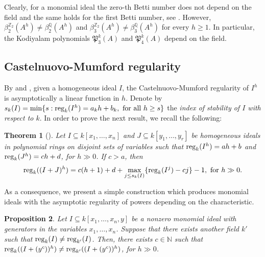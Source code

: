 \documentclass[11pt,oneside]{amsart}
\theoremstyle{plain}
\newtheorem{theorem}{Theorem}[section]
\newtheorem{proposition}[theorem]{Proposition}
\theoremstyle{definition}
\newcommand{\reg}{{\rm reg}}
\newcommand{\Q}{\mathbb{Q}}
\newcommand{\Z}{\mathbb{Z}}
\begin{document}
Clearly, for a monomial ideal the zero-th Betti number does not depend on the field and the same holds for the first Betti number, see \cite[Corollary 5.3]{BH95}. However, $\beta_2^{\Z_2}(A^h) \neq \beta_2^{\Q}(A^h)$ and $\beta_3^{\Z_2}(A^h) \neq \beta_3^{\Q}(A^h)$ for every $h \geq 1$. In particular, the Kodiyalam polynomials $\mathfrak P_3^k(A)$ and $\mathfrak P_4^k(A)$ depend on the field.

\subsection{Castelnuovo-Mumford regularity}

By \cite{CHT99} and \cite{K93}, given a homogeneous ideal $I$, the Castelnuovo-Mumford regularity of $I^h$ is asymptotically a linear function in $h$.
Denote by $s_k(I)=\min \{s: \reg_k(I^h)=a_k h+b_k, \text{ for all } h \geq s\}$ the \textit{index of stability of $I$ with respect to $k$}.
In order to prove the next result, we recall the following:

\begin{theorem}[{\cite[Theorem 5.6]{HTT15}}]\label{HTT}
Let $I \subseteq k[x_1,\ldots,x_n]$ and $J \subseteq k[y_1,\ldots,y_r]$ be homogeneous ideals in polynomial rings on disjoint sets of variables such that $\reg_k(I^h)=ah+b$ and $\reg_k(J^h)=ch+d$, for $h \gg 0$. If $c>a$, then
\[
\reg_k((I+J)^h)=c(h+1)+d+\max_{j \leq s_k(I)}\{\reg_k(I^j)-cj\}-1, \text{   for  } h \gg 0.
\]
\end{theorem}

As a consequence, we present a simple construction which produces monomial ideals with the asymptotic regularity of powers depending on the characteristic.


\begin{proposition}\label{P.asymptoticRegularity}
Let $I \subseteq k[x_1,\dots,x_n,y]$ be a nonzero monomial ideal with generators in the variables $x_1,\dots,x_n$. Suppose that there exists another field $k'$ such that $\reg_{k}(I) \neq \reg_{k'}(I)$. Then, there exists $c \in \mathbb{N}$ such that $\reg_{k} ((I+(y^c))^h) \neq \reg_{k'} ((I+(y^c))^h)$, for $h \gg 0$.
\end{proposition}
\end{document}
